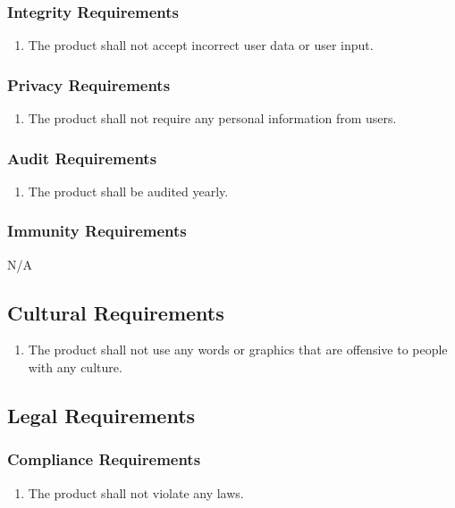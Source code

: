 \documentclass[12pt, titlepage]{article}
\begin{document}
\subsubsection{Integrity Requirements}
\begin{enumerate}
    \item The product shall not accept incorrect user data or user input.
\end{enumerate}

\subsubsection{Privacy Requirements}
\begin{enumerate}
    \item The product shall not require any personal information from users.
\end{enumerate}

\subsubsection{Audit Requirements}
\begin{enumerate}
    \item The product shall be audited yearly.
\end{enumerate}

\subsubsection{Immunity Requirements}
N/A

\subsection{Cultural Requirements}
\begin{enumerate}
    \item The product shall not use any words or graphics that are offensive to people with any culture.
\end{enumerate}

\subsection{Legal Requirements}
\subsubsection{Compliance Requirements}
\begin{enumerate}
    \item The product shall not violate any laws.
\end{enumerate}
\end{document}
